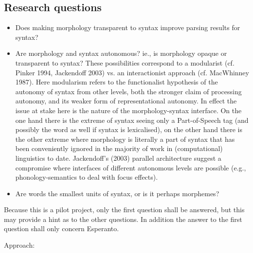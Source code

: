 \documentclass[10pt,a4paper]{article}
\begin{document}
\subsection{Research questions}

\begin{itemize}
\item Does making morphology transparent to syntax improve parsing results for
syntax?
\item Are morphology and syntax autonomous? ie., is morphology opaque or
transparent to syntax? These possibilities correspond to a modularist (cf.
Pinker 1994, Jackendoff 2003) vs. an interactionist approach (cf.  MacWhinney
1987). Here modularism refers to the functionalist hypothesis of the autonomy
of syntax from other levels, both the stronger claim of processing autonomy,
and its weaker form of representational autonomy. In effect the issue at stake
here is the nature of the morphology-syntax interface. On the one hand there is
the extreme of syntax seeing only a Part-of-Speech tag (and possibly the word
as well if syntax is lexicalised), on the other hand there is the other extreme
where morphology is literally a part of syntax that has been conveniently
ignored in the majority of work in (computational) linguistics to date.
Jackendoff's (2003) parallel architecture suggest a compromise where
interfaces of different autonomous levels are possible (e.g.,
phonology-semantics to deal with focus effects).
\item Are words the smallest units of syntax, or is it perhaps morphemes?
\end{itemize}

Because this is a pilot project, only the first question shall be answered,
but this may provide a hint as to the other questions. In addition the answer
to the first question shall only concern Esperanto.

Approach:
\end{document}
